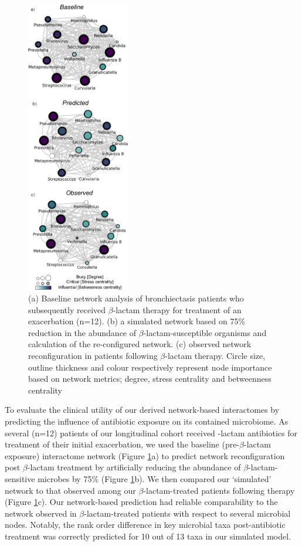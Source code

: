 \begin{figure}[!htb]
	\centering
	\includegraphics[width=0.4\textwidth]{image/antibiotic.png}
	\caption{(a) Baseline network analysis of bronchiectasis patients who subsequently received $\beta$-lactam therapy for treatment of an exacerbation (n=12). (b) a simulated network based on 75\% reduction in the abundance of $\beta$-lactam-susceptible organisms and calculation of the re-configured network. (c) observed network reconfiguration in patients following $\beta$-lactam therapy. Circle size, outline thickness and colour respectively represent node importance based on network metrics; degree, stress centrality and betweenness centrality}
	\label{fig5}
\end{figure}

To evaluate the clinical utility of our derived network-based interactomes by predicting the influence of antibiotic exposure on its contained microbiome. As several (n=12) patients of our longitudinal cohort received -lactam antibiotics for treatment of their initial exacerbation, we used the baseline (pre-$\beta$-lactam exposure) interactome network (Figure \ref{fig5}a) to predict network reconfiguration post $\beta$-lactam treatment by artificially reducing the abundance of $\beta$-lactam-sensitive microbes by 75\% (Figure \ref{fig5}b). We then compared our ‘simulated’ network to that observed among our $\beta$-lactam-treated patients following therapy (Figure \ref{fig5}c). Our network-based prediction had reliable comparability to the network observed in $\beta$-lactam-treated patients with respect to several microbial nodes. Notably, the rank order difference in key microbial taxa post-antibiotic treatment was correctly predicted for 10 out of 13 taxa in our simulated model.\\

